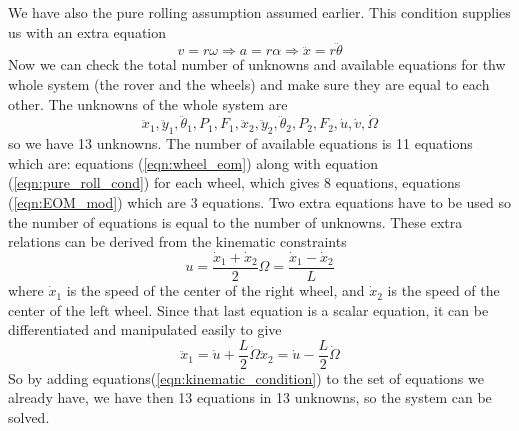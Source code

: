 \documentclass{article}
\begin{document}
	We have also the pure rolling assumption assumed earlier. This condition supplies us with an extra equation
	\begin{equation}
	v = r\omega \Rightarrow a = r\alpha \Rightarrow \ddot{x} = r\ddot{\theta}
	\label{eqn:pure_roll_cond}
	\end{equation}
	Now we can check the total number of unknowns and available equations for thw whole system (the rover and the wheels) and make sure they are equal to each other. The unknowns of the whole system are 
	\[\ddot{x}_1,\ddot{y}_1,\ddot{\theta}_1,P_1,F_1,\ddot{x}_2,\ddot{y}_2,\ddot{\theta}_2,P_2,F_2,\dot{u},\dot{v},\dot{\Omega}
	\]
	so we have 13 unknowns. The number of available equations is 11 equations which are: equations (\ref{eqn:wheel_eom}) along with equation (\ref{eqn:pure_roll_cond}) for each wheel, which gives 8 equations, equations (\ref{eqn:EOM_mod}) which are 3 equations. Two extra equations have to be used so the number of equations is equal to the number of unknowns. These extra relations can be derived from the kinematic constraints
	\begin{subequations}
		\begin{equation}
		u = \frac{\dot{x}_1+\dot{x}_2}{2}
		\end{equation}
		\begin{equation}
		\Omega = \frac{\dot{x}_1 - \dot{x}_2}{L}
		\end{equation}
	\end{subequations}
	where $\dot{x}_1$ is the speed of the center of the right wheel, and $\dot{x}_2$ is the speed of the center of the left wheel. Since that last equation is a scalar equation, it can be differentiated and manipulated easily to give
	\begin{subequations}
		\begin{equation}
		\ddot{x}_1 = \dot{u} + \frac{L}{2}\dot{\Omega}
		\label{eqn:kinematic1}
		\end{equation}
		\begin{equation}
		\ddot{x}_2 = \dot{u} - \frac{L}{2}\dot{\Omega}
		\label{eqn:kinematic2}
		\end{equation}
		\label{eqn:kinematic_condition}
	\end{subequations}
	So by adding equations(\ref{eqn:kinematic_condition}) to the set of equations we already have, we have then 13 equations in 13 unknowns, so the system can be solved. 
\end{document}
